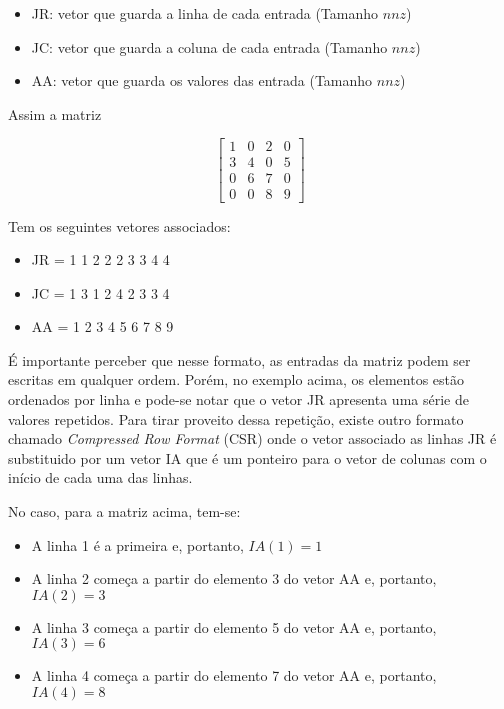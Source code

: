 \begin{itemize}
    \item JR: vetor que guarda a linha de cada entrada (Tamanho $nnz$)
    \item JC: vetor que guarda a coluna de cada entrada (Tamanho $nnz$)
    \item AA: vetor que guarda os valores das entrada (Tamanho $nnz$)
\end{itemize}


Assim a matriz

\begin{equation}
    \begin{bmatrix}
        1 & 0 & 2 & 0\\
        3 & 4 & 0 & 5\\
        0 & 6 & 7 & 0\\
        0 & 0 & 8 &9
    \end{bmatrix}
\end{equation}

Tem os seguintes vetores associados:

\begin{center}
    \begin{itemize}
        \item JR = 1 1 2 2 2 3 3 4 4
        \item JC = 1 3 1 2 4 2 3 3 4
        \item AA = 1 2 3 4 5 6 7 8 9
    \end{itemize}
\end{center}

É importante perceber que nesse formato, as entradas da matriz podem ser escritas em qualquer ordem. Porém, no exemplo acima, os elementos estão ordenados por linha e pode-se notar que o vetor JR apresenta uma série de valores repetidos. Para tirar proveito dessa repetição, existe outro formato chamado \textit{Compressed Row Format} (CSR) onde o vetor associado as linhas JR é substituido por um vetor IA que é um ponteiro para o vetor de colunas com o início de cada uma das linhas.

No caso, para a matriz acima, tem-se:

\begin{itemize}
    \item A linha 1 é a primeira e, portanto, $IA(1) = 1$
    \item A linha 2 começa a partir do elemento 3 do vetor AA e, portanto, $IA(2) = 3$
    \item A linha 3 começa a partir do elemento 5 do vetor AA e, portanto, $IA(3) = 6$
    \item A linha 4 começa a partir do elemento 7 do vetor AA e, portanto, $IA(4) = 8$
\end{itemize}


